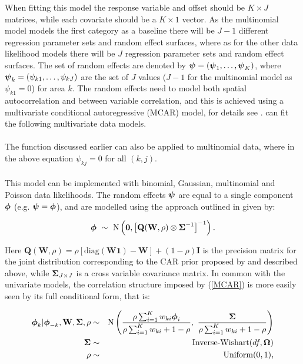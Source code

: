 \documentclass[article,shortnames,nojss]{jss}
\newcommand{\bd}[1]{\ensuremath{\mbox{\boldmath $#1$}}}
\begin{document}
When fitting this model the response variable and offset should be $K\times J$ matrices, while each covariate should be a $K\times 1$ vector. As the multinomial model models the first category as a baseline there will be $J-1$ different regression parameter sets and random effect surfaces, where as for the other data likelihood models there will be $J$ regression parameter sets and random effect surfaces. The set of random effects are denoted by $\bd{\psi}=(\bd{\psi}_1,\ldots,\bd{\psi}_{K})$, where $\bd{\psi}_{k}=(\psi_{k1},\ldots,\psi_{kJ})$ are the set of $J$ values ($J-1$ for the multinomial model as $\psi_{k1}=0$) for area $k$. The random effects need to model both spatial autocorrelation and between variable correlation, and this is achieved using a multivariate conditional autoregressive (MCAR) model, for details see \cite{gelfand2003}.  can fit the following multivariate data models.\\

\\
The  function discussed earlier can also be applied to multinomial data, where in the above equation $\psi_{kj}=0$ for all $(k,j)$.\\  


\\
This model can be implemented with binomial, Gaussian, multinomial and Poisson data likelihoods. The random effects $\bd{\psi}$ are equal to a single component $\bd{\phi}$ (e.g. $\bd{\psi}=\bd{\phi}$), and are modelled using the approach outlined in \cite{Kavanagh2016} given by:

\begin{equation}
\bd{\phi}~\sim~\mbox{N}\left(\mathbf{0},\left[\mathbf{Q}(\mathbf{W},\rho) \otimes \bd{\Sigma}^{-1}\right]^{-1}\right).
\label{MCAR}
\end{equation}


Here $\mathbf{Q}(\mathbf{W},\rho)=\rho[\mbox{diag}(\mathbf{W}\mathbf{1}) - \mathbf{W}] + (1-\rho)\mathbf{I}$ is the precision matrix for the joint distribution corresponding to the CAR prior proposed by \cite{leroux2000} and described above, while $\bd{\Sigma}_{J\times J}$ is a cross variable covariance matrix. In common with the univariate models, the correlation structure imposed by (\ref{MCAR}) is more easily seen by its full conditional form, that is:


\begin{eqnarray}
\bd{\phi}_{k}| \bd{\phi}_{-k},\mathbf{W},\bd{\Sigma}, \rho&\sim&\mbox{N}\left(\frac{\rho\sum_{i=1}^{K}w_{ki}\bd{\phi}_{i}}{\rho\sum_{i=1}^{K}w_{ki} + 1-\rho},~
\frac{\bd{\Sigma}}{\rho\sum_{i=1}^{K}w_{ki} + 1-\rho}\right)\nonumber\\
\bd{\Sigma}&\sim&\mbox{Inverse-Wishart}(df, \bd{\Omega})\nonumber\\
\rho&\sim&\mbox{Uniform}(0,1),\nonumber
\end{eqnarray}
\end{document}
